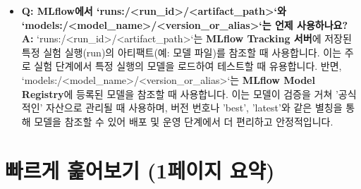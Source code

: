 \documentclass[11pt,a4paper]{article}
\begin{document}
\begin{tcolorbox}[summarybox={초심자를 위한 Q\&A}]
\begin{itemize}
    \item \textbf{Q: MLflow에서 `runs:/<run_id>/<artifact_path>`와 `models:/<model_name>/<version_or_alias>`는 언제 사용하나요?}
    \textbf{A:} `runs:/<run_id>/<artifact_path>`는 \textbf{MLflow Tracking 서버}에 저장된 특정 실험 실행(run)의 아티팩트(예: 모델 파일)를 참조할 때 사용합니다. 이는 주로 실험 단계에서 특정 실행의 모델을 로드하여 테스트할 때 유용합니다. 반면, `models:/<model_name>/<version_or_alias>`는 \textbf{MLflow Model Registry}에 등록된 모델을 참조할 때 사용합니다. 이는 모델이 검증을 거쳐 '공식적인' 자산으로 관리될 때 사용하며, 버전 번호나 'best', 'latest'와 같은 별칭을 통해 모델을 참조할 수 있어 배포 및 운영 단계에서 더 편리하고 안정적입니다.
\end{itemize}
\end{tcolorbox}

\newpage
\section*{빠르게 훑어보기 (1페이지 요약)}
\end{document}
